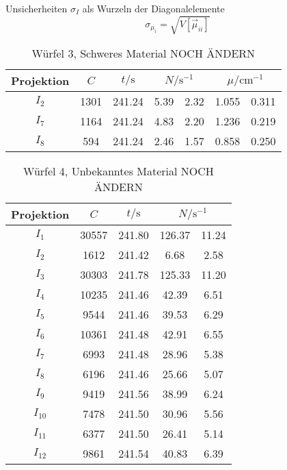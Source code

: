 Unsicherheiten $\sigma_I$ als Wurzeln der Diagonalelemente
\begin{equation*}
    \sigma_{\mu_i} = \sqrt{V[\vec{\mu}_{ii}]} 
\end{equation*}
\FloatBarrier
\begin{table}[h]
    \centering
    \caption{Würfel 3, Schweres Material NOCH ÄNDERN}
    \label{tab:W3}
    \begin{tabular}{c S[table-format=4.0] S[table-format=3.2] S[table-format=1.2]@{${}\pm{}$} S[table-format=1.2] S[table-format=1.3]@{${}\pm{}$} S[table-format=1.3]}
        \toprule
        {Projektion} & {$C$} & {$t/\si{\s}$} &  &  \\
        \midrule
        $I_2$ & 1301 & 241.24 & 5.39 & 2.32 & 1.055 & 0.311\\
        $I_7$ & 1164 & 241.24 & 4.83 & 2.20 & 1.236 & 0.219\\
        $I_8$ & 594  & 241.24 & 2.46 & 1.57 & 0.858 & 0.250\\
        \bottomrule
    \end{tabular}
\end{table}
\FloatBarrier
\noindent
\FloatBarrier
\begin{table}[h]
    \centering
    \caption{Würfel 4, Unbekanntes Material NOCH ÄNDERN}
    \label{tab:W4}
    \begin{tabular}{c S[table-format=5.0] S[table-format=3.2] S[table-format=3.2]@{${}\pm{}$} S[table-format=2.2]}
        \toprule
        {Projektion} & {$C$} & {$t/\si{\s}$} &  \\
        \midrule
        $I_1$    & 30557 & 241.80 & 126.37 & 11.24 \\
        $I_2$    & 1612  & 241.42 & 6.68   & 2.58  \\
        $I_3$    & 30303 & 241.78 & 125.33 & 11.20 \\
        $I_4$    & 10235 & 241.46 & 42.39  & 6.51  \\
        $I_5$    & 9544  & 241.46 & 39.53  & 6.29  \\
        $I_6$    & 10361 & 241.48 & 42.91  & 6.55  \\
        $I_7$    & 6993  & 241.48 & 28.96  & 5.38  \\
        $I_8$    & 6196  & 241.46 & 25.66  & 5.07  \\
        $I_9$    & 9419  & 241.56 & 38.99  & 6.24  \\
        $I_{10}$ & 7478  & 241.50 & 30.96  & 5.56  \\
        $I_{11}$ & 6377  & 241.50 & 26.41  & 5.14  \\
        $I_{12}$ & 9861  & 241.54 & 40.83  & 6.39  \\
        \bottomrule
    \end{tabular}
\end{table}
